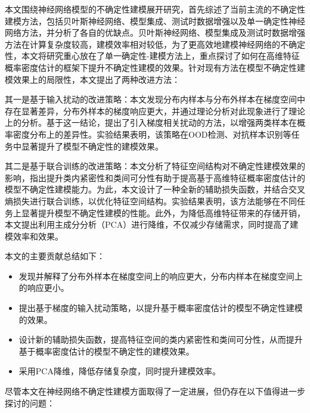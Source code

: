 本文围绕神经网络模型的不确定性建模展开研究，首先综述了当前主流的不确定性建模方法，包括贝叶斯神经网络、模型集成、测试时数据增强以及单一确定性神经网络方法，并分析了各自的优缺点。贝叶斯神经网络、模型集成及测试时数据增强方法在计算复杂度较高，建模效率相对较低，为了更高效地建模神经网络的不确定性，本文将研究重心放在了单一确定性-建模方法上，重点探讨了如何在高维特征概率密度估计的框架下提升不确定性建模的效果。针对现有方法在模型不确定性建模效果上的局限性，本文提出了两种改进方法：

其一是基于输入扰动的改进策略：本文发现分布内样本与分布外样本在梯度空间中存在显著差异，分布外样本的梯度响应更大，并通过理论分析对此现象进行了理论上的分析。基于这一结论，提出了引入梯度相关扰动的方法，以增强两类样本在概率密度分布上的差异性。实验结果表明，该策略在OOD检测、对抗样本识别等任务中显著提升了模型不确定性的建模效果。

其二是基于联合训练的改进策略：本文分析了特征空间结构对不确定性建模效果的影响，指出提升类内紧密性和类间可分性有助于提高基于高维特征概率密度估计的模型不确定性建模能力。为此，本文设计了一种全新的辅助损失函数，并结合交叉熵损失进行联合训练，以优化特征空间结构。实验结果表明，该方法能够在不同任务上显著提升模型不确定性建模的性能。此外，为降低高维特征带来的存储开销，本文提出利用主成分分析（PCA）进行降维，不仅减少存储需求，同时提高了建模效率和效果。

本文的主要贡献总结如下：
\begin{itemize}
    \item 发现并解释了分布外样本在梯度空间上的响应更大，分布内样本在梯度空间上的响应更小。
    \item 提出基于梯度的输入扰动策略，以提升基于概率密度估计的模型不确定性建模的效果。
    \item 设计新的辅助损失函数，提高特征空间的类内紧密性和类间可分性，从而提升基于概率密度估计的模型不确定性的建模效果。
    \item 采用PCA降维，降低存储复杂度，同时提升建模效率。
\end{itemize}

尽管本文在神经网络不确定性建模方面取得了一定进展，但仍存在以下值得进一步探讨的问题：

